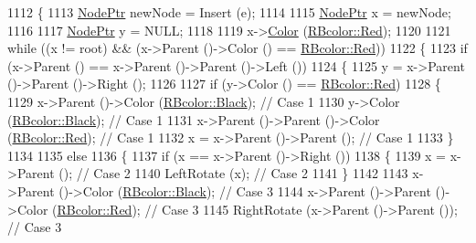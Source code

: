 \begin{DoxyCode}
1112 \{
1113   \hyperlink{class_k_k_b_1_1_r_b_tree_a6b0f3cc33c4554c51afe9bbb82c41906}{NodePtr}  newNode = Insert (e);
1114 
1115   \hyperlink{class_k_k_b_1_1_r_b_tree_a6b0f3cc33c4554c51afe9bbb82c41906}{NodePtr}  x = newNode;
1116 
1117   \hyperlink{class_k_k_b_1_1_r_b_tree_a6b0f3cc33c4554c51afe9bbb82c41906}{NodePtr}  y = NULL;
1118 
1119   x->\hyperlink{class_k_k_b_1_1_r_bnode_a584eaab9411cfa40db738fb57da7c8c0}{Color} (\hyperlink{namespace_k_k_b_a8efe8f8963250404085241be900c7548aee38e4d5dd68c4e440825018d549cb47}{RBcolor::Red});
1120 
1121   \textcolor{keywordflow}{while}  ((x != root)  &&  (x->Parent ()->Color () == \hyperlink{namespace_k_k_b_a8efe8f8963250404085241be900c7548aee38e4d5dd68c4e440825018d549cb47}{RBcolor::Red}))
1122   \{
1123     \textcolor{keywordflow}{if}  (x->Parent () == x->Parent ()->Parent ()->Left ())
1124     \{
1125       y = x->Parent ()->Parent ()->Right ();
1126 
1127       \textcolor{keywordflow}{if}  (y->Color () == \hyperlink{namespace_k_k_b_a8efe8f8963250404085241be900c7548aee38e4d5dd68c4e440825018d549cb47}{RBcolor::Red})
1128       \{
1129         x->Parent ()->Color (\hyperlink{namespace_k_k_b_a8efe8f8963250404085241be900c7548ae90dfb84e30edf611e326eeb04d680de}{RBcolor::Black});          \textcolor{comment}{// Case 1}
1130         y->Color (\hyperlink{namespace_k_k_b_a8efe8f8963250404085241be900c7548ae90dfb84e30edf611e326eeb04d680de}{RBcolor::Black});                     \textcolor{comment}{// Case 1}
1131         x->Parent ()->Parent ()->Color (\hyperlink{namespace_k_k_b_a8efe8f8963250404085241be900c7548aee38e4d5dd68c4e440825018d549cb47}{RBcolor::Red}); \textcolor{comment}{// Case 1}
1132         x = x->Parent ()->Parent ();                   \textcolor{comment}{// Case 1}
1133       \}
1134 
1135       \textcolor{keywordflow}{else}
1136       \{
1137         \textcolor{keywordflow}{if}  (x == x->Parent ()->Right ())
1138         \{        
1139           x = x->Parent ();                       \textcolor{comment}{// Case 2}
1140           LeftRotate (x);                         \textcolor{comment}{// Case 2}
1141         \}
1142 
1143         x->Parent ()->Color (\hyperlink{namespace_k_k_b_a8efe8f8963250404085241be900c7548ae90dfb84e30edf611e326eeb04d680de}{RBcolor::Black});          \textcolor{comment}{// Case 3}
1144         x->Parent ()->Parent ()->Color (\hyperlink{namespace_k_k_b_a8efe8f8963250404085241be900c7548aee38e4d5dd68c4e440825018d549cb47}{RBcolor::Red}); \textcolor{comment}{// Case 3}
1145         RightRotate (x->Parent ()->Parent ());         \textcolor{comment}{// Case 3}

\end{DoxyCode}
